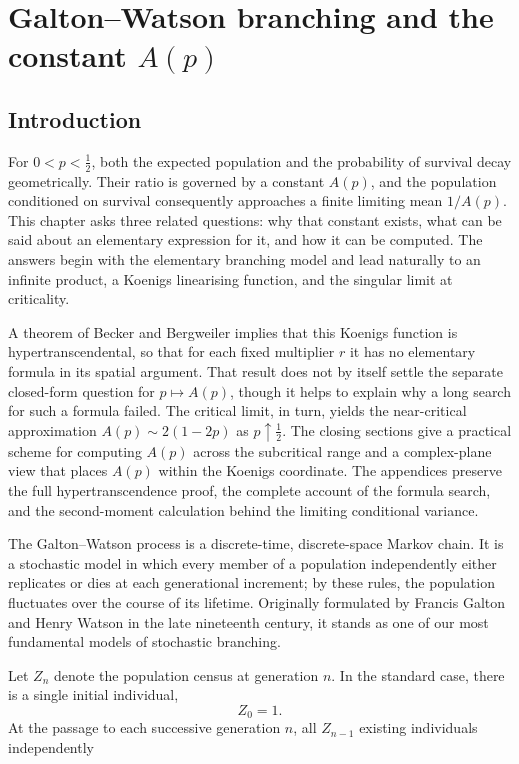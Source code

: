 \chapter[Galton--Watson branching and the constant $A(p)$]{Galton--Watson branching and the constant $A(p)$}
\label{gw:ch:galton-watson}

\section{Introduction}

For $0<p<\tfrac12$, both the expected population and the probability of survival
decay geometrically. Their ratio is governed by a constant $A(p)$, and the
population conditioned on survival consequently approaches a finite limiting mean
$1/A(p)$. This chapter asks three related questions: why that constant exists,
what can be said about an elementary expression for it, and how it can be
computed.
The answers begin with the elementary branching model and lead naturally to an
infinite product, a Koenigs linearising function, and the singular limit at
criticality.

A theorem of Becker and Bergweiler implies that this Koenigs function is
hypertranscendental, so that for each fixed multiplier $r$ it has no elementary
formula in its spatial argument. That result does not by itself settle the
separate closed-form question for $p\mapsto A(p)$, though it helps to explain why
a long search for such a formula failed. The critical limit, in turn, yields the
near-critical approximation $A(p)\sim2(1-2p)$ as $p\uparrow\tfrac12$. The closing
sections give a practical scheme for computing $A(p)$ across the subcritical range
and a complex-plane view that places $A(p)$ within the Koenigs coordinate. The
appendices preserve the full hypertranscendence proof, the complete account of the
formula search, and the second-moment calculation behind the limiting conditional
variance.

The Galton--Watson process is a discrete-time, discrete-space Markov chain.
It is a stochastic model in which every member of a population independently
either replicates or dies at each generational increment; by these rules, the population
fluctuates over the course of its lifetime. Originally formulated by
Francis Galton and Henry Watson in the late nineteenth century, it stands as one of our most 
fundamental models of stochastic branching. 

Let $Z_n$ denote the population census at generation $n$.
In the standard case, there is a single initial individual,
\[
Z_0 = 1.
\]
At the passage to each successive generation $n$, all $Z_{n-1}$ existing individuals
independently

